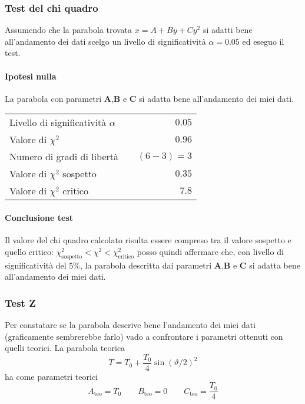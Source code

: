 \documentclass{article}
\begin{document}
	
	\subsubsection{Test del chi quadro}
	Assumendo che la parabola trovata $x=A+By+Cy^2$ si adatti bene all'andamento dei dati scelgo un livello di significatività $\alpha = 0.05$ ed eseguo il test.
	
	\paragraph{Ipotesi nulla} La parabola con parametri \textbf{A},\textbf{B} e \textbf{C} si adatta bene all'andamento dei miei dati.
	
	\vspace{0.7cm}
	\begin{table}[H]
		\centering
		\begin{tabular}{lr} 
			Livello di significatività $\alpha$		&$\quad 0.05$  \\
			Valore di $\chi ^2$             		& $\quad 0.96$       \\
			Numero di gradi di libertà      		& $\quad (6-3) = 3$         \\   
			Valore di $\chi ^2$ sospetto			& $\quad 0.35$ \\
			Valore di $\chi ^2$ critico     		& $\quad 7.8$
		\end{tabular}
	\end{table}
	\vspace{0.7cm}
	
	\paragraph{Conclusione test}
	Il valore del chi quadro calcolato risulta essere compreso tra il valore sospetto e quello critico: $\chi^2_\text{sospetto} < \chi ^2 < \chi^2_\text{critico}$ posso quindi affermare che, con livello di significatività del 5\%, la parabola descritta dai parametri \textbf{A},\textbf{B} e \textbf{C} si adatta bene all'andamento dei miei dati.
	
	
	\subsubsection{Test Z}
	Per constatare se la parabola descrive bene l'andamento dei miei dati (graficamente sembrerebbe farlo) vado a confrontare i parametri ottenuti con quelli teorici. La parabola teorica 
	\[
	T = T_0 + \frac{T_0}{4}\sin{(\vartheta/2)}^2
	\]
	ha come parametri teorici
	\[
	A_\text{teo} = T_0 \qquad B_\text{teo} = 0 \qquad C_\text{teo} =  \frac{T_0}{4} 
	\]
	
\end{document}
